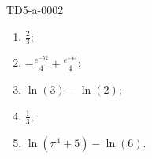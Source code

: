 
\begin{corrige}{TD5-a-0002}

	\begin{enumerate}
		\item
			$\frac{ 2 }{ 3 }$;
		\item
			$-\frac{  e^{-52} }{ 4 }+ \frac{  e^{-44} }{ 4 }$;
		\item
			$\ln(3)-\ln(2)$;
		\item
			$\frac{1}{ 3 }$;
		\item
			$\ln(\pi^4+5)-\ln(6)$.
	\end{enumerate}

\end{corrige}
